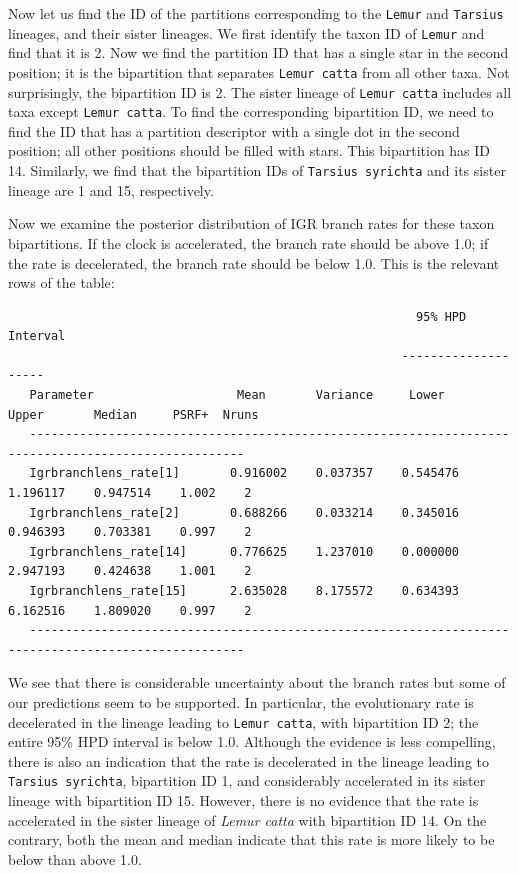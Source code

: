 \documentclass[12pt]{book}
\begin{document}
Now let us find the ID of the partitions corresponding to the \texttt{Lemur} and \texttt{Tarsius}
lineages, and their sister lineages. We first identify the taxon ID of \texttt{Lemur} and find that
it is 2. Now we find the partition ID that has a single star in the second position; it is the
bipartition that separates \texttt{Lemur catta} from all other taxa. Not surprisingly, the
bipartition ID is 2. The sister lineage of \texttt{Lemur catta} includes all taxa except
\texttt{Lemur catta}. To find the corresponding bipartition ID, we need to find the ID that has a
partition descriptor with a single dot in the second position; all other positions should be filled
with stars. This bipartition has ID 14. Similarly, we find that the bipartition IDs of
\texttt{Tarsius syrichta} and its sister lineage are 1 and 15, respectively.

Now we examine the posterior distribution of IGR branch rates for these taxon bipartitions. If the
clock is accelerated, the branch rate should be above 1.0; if the rate is decelerated, the branch
rate should be below 1.0. This is the relevant rows of the table:

\scriptsize
\begin{singlespacing}
\begin{verbatim}
                                                         95% HPD Interval
                                                       --------------------
   Parameter                    Mean       Variance     Lower       Upper       Median     PSRF+  Nruns
   ----------------------------------------------------------------------------------------------------
   Igrbranchlens_rate[1]       0.916002    0.037357    0.545476    1.196117    0.947514    1.002    2
   Igrbranchlens_rate[2]       0.688266    0.033214    0.345016    0.946393    0.703381    0.997    2
   Igrbranchlens_rate[14]      0.776625    1.237010    0.000000    2.947193    0.424638    1.001    2
   Igrbranchlens_rate[15]      2.635028    8.175572    0.634393    6.162516    1.809020    0.997    2
   ----------------------------------------------------------------------------------------------------
\end{verbatim}
\end{singlespacing}
\normalsize

We see that there is considerable uncertainty about the branch rates but some of our predictions
seem to be supported. In particular, the evolutionary rate is decelerated in the lineage leading to
\texttt{Lemur catta}, with bipartition ID 2; the entire 95\% HPD interval is below 1.0. Although
the evidence is less compelling, there is also an indication that the rate is decelerated in the
lineage leading to \texttt{Tarsius syrichta}, bipartition ID 1, and considerably accelerated in its
sister lineage with bipartition ID 15. However, there is no evidence that the rate is accelerated
in the sister lineage of \textit{Lemur catta} with bipartition ID 14. On the contrary, both the
mean and median indicate that this rate is more likely to be below than above 1.0.
\end{document}
